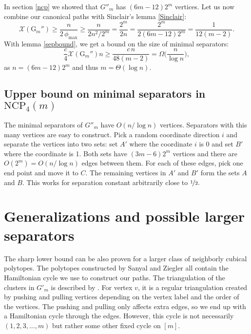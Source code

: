 \documentclass[a4paper,12pt]{book}
\theoremstyle{plain}
\theoremstyle{definition}
\newcommand\NC{\textrm{NCP}}
\newcommand\CG{\mathrm{G}}
\begin{document}
In section \ref{ncp} we showed that $G''_m$ has $(6m-12)2^m$ vertices. Let us
now combine our canonical paths with Sinclair's lemma \ref{Sinclair}:
\begin{equation}
\mathcal{X}(\CG_m'') 
\ge \frac{n}{2\,\phi_{\max}} 
\ge \frac{n}{2n^2/2^m}
  = \frac{2^m}{2n}
  = \frac{2^m}{2(6m-12)2^m}
  = \frac{1}{12(m-2)}. 
\end{equation}
With lemma \ref{sepbound}, we get a bound on the size of minimal separators:
\begin{equation}
\frac c4 \mathcal{X}(\CG_m'')n 
\ge \frac{c\,n}{48(m-2)} 
 =  \Omega\Big(\frac n{\log n}\Big),
\end{equation}
as $n = (6m-12)2^m$ and thus $m=\Theta(\log n)$.

\section{Upper bound on minimal separators in $\NC_4(m)$}

The minimal separators of $G''_m$ have $O(n/\log n)$ vertices. Separators with this
many vertices are easy to construct. Pick a random coordinate direction $i$ and separate
the vertices into two sets: set $A'$ where the coordinate $i$ is 0 and set $B'$ where the coordinate
is 1. Both sets have $(3m-6)2^m$ vertices and there are $O(2^m) = O(n/\log n)$ edges between them. For each of
these edges, pick one end point and move it to $C$. The remaining vertices in $A'$ and $B'$ form
the sets $A$ and $B$. This works for separation constant arbitrarily close to $\nicefrac{1}{2}.$

\chapter{Generalizations and possible larger separators}
\label{genes}

The sharp lower bound can be also proven for a larger class of neighborly cubical polytopes.
The polytopes constructed by Sanyal and Ziegler \cite{Z102} all contain the Hamiltonian
cycle we use to construct our paths. The triangulation of the clusters in $G'_m$ is described by
\cite[Thm 3.7.]{Z102}. For vertex $v$, it is a regular triangulation created by pushing 
and pulling vertices depending on the vertex label and the order of the vertices. 
The pushing and pulling only affects extra edges, so we end up with a Hamiltonian
cycle through the edges. However, this cycle is not necessarily $(1,2,3,\dots,m)$ but
rather some other fixed cycle on $[m]$.
\end{document}
